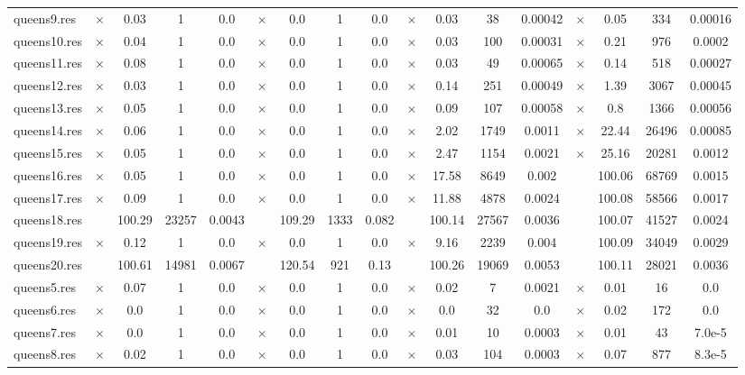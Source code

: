 \documentclass[main.tex]{subfiles}
\begin{document}
\begin{landscape}
\begin{center}
\begin{tabular}{|l|cccc|cccc|cccc|cccc|}
\\
queens9.res & $\times$ & 0.03 & 1 & 0.0
 & $\times$ & 0.0 & 1 & 0.0
 & $\times$ & 0.03 & 38 & 0.00042
 & $\times$ & 0.05 & 334 & 0.00016
\\
queens10.res & $\times$ & 0.04 & 1 & 0.0
 & $\times$ & 0.0 & 1 & 0.0
 & $\times$ & 0.03 & 100 & 0.00031
 & $\times$ & 0.21 & 976 & 0.0002
\\
queens11.res & $\times$ & 0.08 & 1 & 0.0
 & $\times$ & 0.0 & 1 & 0.0
 & $\times$ & 0.03 & 49 & 0.00065
 & $\times$ & 0.14 & 518 & 0.00027
\\
queens12.res & $\times$ & 0.03 & 1 & 0.0
 & $\times$ & 0.0 & 1 & 0.0
 & $\times$ & 0.14 & 251 & 0.00049
 & $\times$ & 1.39 & 3067 & 0.00045
\\
queens13.res & $\times$ & 0.05 & 1 & 0.0
 & $\times$ & 0.0 & 1 & 0.0
 & $\times$ & 0.09 & 107 & 0.00058
 & $\times$ & 0.8 & 1366 & 0.00056
\\
queens14.res & $\times$ & 0.06 & 1 & 0.0
 & $\times$ & 0.0 & 1 & 0.0
 & $\times$ & 2.02 & 1749 & 0.0011
 & $\times$ & 22.44 & 26496 & 0.00085
\\
queens15.res & $\times$ & 0.05 & 1 & 0.0
 & $\times$ & 0.0 & 1 & 0.0
 & $\times$ & 2.47 & 1154 & 0.0021
 & $\times$ & 25.16 & 20281 & 0.0012
\\
queens16.res & $\times$ & 0.05 & 1 & 0.0
 & $\times$ & 0.0 & 1 & 0.0
 & $\times$ & 17.58 & 8649 & 0.002
 &  & 100.06 & 68769 & 0.0015
\\
queens17.res & $\times$ & 0.09 & 1 & 0.0
 & $\times$ & 0.0 & 1 & 0.0
 & $\times$ & 11.88 & 4878 & 0.0024
 &  & 100.08 & 58566 & 0.0017
\\
queens18.res &  & 100.29 & 23257 & 0.0043
 &  & 109.29 & 1333 & 0.082
 &  & 100.14 & 27567 & 0.0036
 &  & 100.07 & 41527 & 0.0024
\\
queens19.res & $\times$ & 0.12 & 1 & 0.0
 & $\times$ & 0.0 & 1 & 0.0
 & $\times$ & 9.16 & 2239 & 0.004
 &  & 100.09 & 34049 & 0.0029
\\
queens20.res &  & 100.61 & 14981 & 0.0067
 &  & 120.54 & 921 & 0.13
 &  & 100.26 & 19069 & 0.0053
 &  & 100.11 & 28021 & 0.0036
\\
queens5.res & $\times$ & 0.07 & 1 & 0.0
 & $\times$ & 0.0 & 1 & 0.0
 & $\times$ & 0.02 & 7 & 0.0021
 & $\times$ & 0.01 & 16 & 0.0
\\
queens6.res & $\times$ & 0.0 & 1 & 0.0
 & $\times$ & 0.0 & 1 & 0.0
 & $\times$ & 0.0 & 32 & 0.0
 & $\times$ & 0.02 & 172 & 0.0
\\
queens7.res & $\times$ & 0.0 & 1 & 0.0
 & $\times$ & 0.0 & 1 & 0.0
 & $\times$ & 0.01 & 10 & 0.0003
 & $\times$ & 0.01 & 43 & 7.0e-5
\\
queens8.res & $\times$ & 0.02 & 1 & 0.0
 & $\times$ & 0.0 & 1 & 0.0
 & $\times$ & 0.03 & 104 & 0.0003
 & $\times$ & 0.07 & 877 & 8.3e-5
\\
\hline\end{tabular}
\end{center}
\end{landscape}
\end{document}
